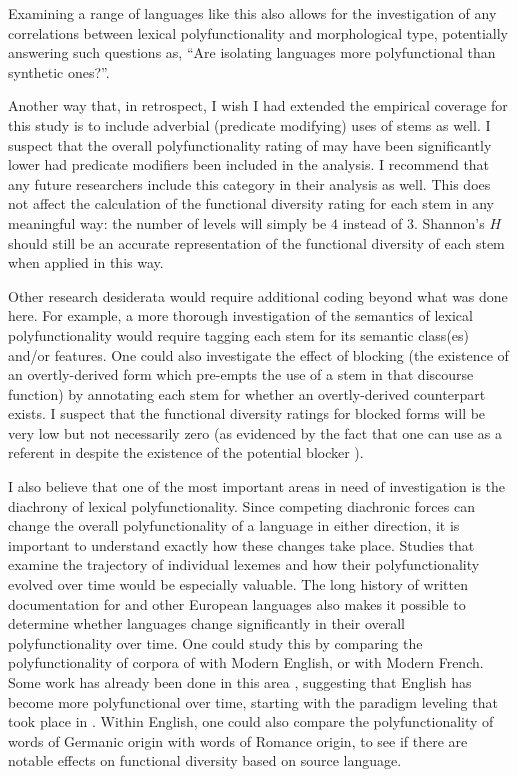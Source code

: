 Examining a range of languages like this also allows for the investigation of any correlations between lexical polyfunctionality and morphological type, potentially answering such questions as, \enquote{Are isolating languages more polyfunctional than synthetic ones?}. 

Another way that, in retrospect, I wish I had extended the empirical coverage for this study is to include adverbial (predicate modifying) uses of stems as well. I suspect that the overall polyfunctionality rating of  may have been significantly lower had predicate modifiers been included in the analysis. I recommend that any future researchers include this category in their analysis as well. This does not affect the calculation of the functional diversity rating for each stem in any meaningful way: the number of levels will simply be $4$ instead of $3$. Shannon's $H$ should still be an accurate representation of the functional diversity of each stem when applied in this way.

Other research desiderata would require additional coding beyond what was done here. For example, a more thorough investigation of the semantics of lexical polyfunctionality would require tagging each stem for its semantic class(es) and/or features. One could also investigate the effect of blocking (the existence of an overtly-derived form which pre-empts the use of a stem in that discourse function) by annotating each stem for whether an overtly-derived counterpart exists. I suspect that the functional diversity ratings for blocked forms will be very low but not necessarily zero (as evidenced by the fact that one can use  as a referent in  despite the existence of the potential blocker ).

I also believe that one of the most important areas in need of investigation is the diachrony of lexical polyfunctionality. Since competing diachronic forces can change the overall polyfunctionality of a language in either direction, it is important to understand exactly how these changes take place. Studies that examine the trajectory of individual lexemes and how their polyfunctionality evolved over time would be especially valuable. The long history of written documentation for  and other European languages also makes it possible to determine whether languages change significantly in their overall polyfunctionality over time. One could study this by comparing the polyfunctionality of corpora of  with Modern English, or  with Modern French. Some work has already been done in this area \parencites[414]{Cannon1985}{Kastovsky1996}, suggesting that English has become more polyfunctional over time, starting with the paradigm leveling that took place in . Within English, one could also compare the polyfunctionality of words of Germanic origin with words of Romance origin, to see if there are notable effects on functional diversity based on source language.

